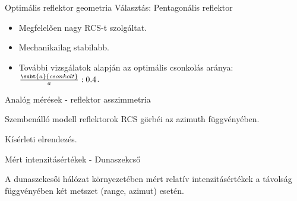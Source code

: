 \documentclass[aspectratio=169]{beamer}
\begin{document}
\begin{frame}{Optimális reflektor geometria}
    Választás: Pentagonális reflektor
    
    \begin{itemize}
        \item Megfelelően nagy RCS-t szolgáltat.
        \item Mechanikailag stabilabb.
        \item További vizsgálatok alapján az optimális csonkolás aránya: $\frac{\subt{a}{csonkolt}}{a}: 0.4$.
    \end{itemize}
\end{frame}


\begin{frame}{Analóg mérések - reflektor asszimmetria}
    \begin{minipage}[c]{0.65\textwidth}
        \centering
        
        Szembenálló modell reflektorok RCS görbéi az azimuth függvényében.
    \end{minipage}
    \begin{minipage}[c]{0.3\textwidth}
        \centering
        Kísérleti elrendezés.
        \vspace{10pt}
        
        \begin{minipage}[c]{\textwidth}
        \end{minipage}
        \vspace{10pt}
        
        \begin{minipage}[c]{\textwidth}
        \end{minipage}
    \end{minipage}
\end{frame}

\begin{frame}{Mért intenzitásértékek - Dunaszekcső}
    \begin{minipage}[t]{0.45\textwidth}
        \centering
    \end{minipage}
    \hspace{10pt}
    \begin{minipage}[t]{0.45\textwidth}
        \centering
    \end{minipage}
    
    \begin{center}
        A dunaszekcsői hálózat környezetében mért relatív intenzitásértékek a távolság függvényében két metszet (range, azimut) esetén.
    \end{center}
\end{frame}
\end{document}
